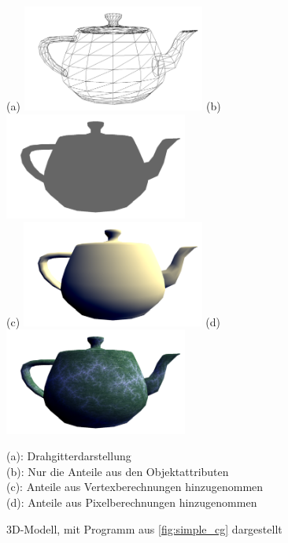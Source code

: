 \documentclass[twoside,a4paper,fleqn,12pt]{book}
\begin{document}
\begin{figure}[h]
  \centering
  (a) \includegraphics[width=6cm]{mesh_wireframe_thin}\qquad
  (b) \includegraphics[width=6cm]{simple_s1_mesh}\\
  \vspace{1em}
  (c) \includegraphics[width=6cm]{simple_s1_vert}\qquad
  (d) \includegraphics[width=6cm]{simple_s1_frag}
  \caption{3D-Modell, mit Programm aus \ref{fig:simple_cg} dargestellt}
  \small (a): Drahgitterdarstellung\\
  (b): Nur die Anteile aus den Objektattributen\\
  (c): Anteile aus Vertexberechnungen hinzugenommen\\
  (d): Anteile aus Pixelberechnungen hinzugenommen
  \label{fig:simple_cg_images}
\end{figure}
\end{document}

